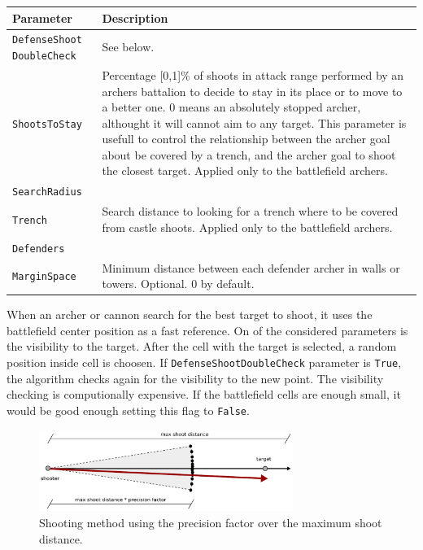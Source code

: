 \documentclass[tog]{acmsiggraph}
\begin{document}
\begin{tabularx}{0.48\textwidth}{ |l|X| }
\hline 
\textbf{Parameter} & \textbf{Description} \\[0.15cm]
 \hline
 \texttt{DefenseShoot DoubleCheck} & See below. \\
 \hline
 \texttt{ShootsToStay} & Percentage [0,1]\% of shoots in attack range performed by an archers battalion to decide to stay in its place or to move to a better one. 0 means an absolutely stopped archer, althought it will cannot aim to any target. This parameter is usefull to control the relationship between the archer goal about be covered by a trench, and the archer goal to shoot the closest target. Applied only to the battlefield archers. \\
 \hline
 \texttt{SearchRadius} & \\
 \texttt{Trench} & Search distance to looking for a trench where to be covered from castle shoots. Applied only to the battlefield archers. \\
 \hline
 \texttt{Defenders} & \\
 \texttt{MarginSpace} & Minimum distance between each defender archer in walls or towers. Optional. 0 by default.\\
 \hline 
\end{tabularx} 

When an archer or cannon search for the best target to shoot, it uses the battlefield center position as a fast reference. 
On of the considered parameters is the visibility to the target.
After the cell with the target is selected, a random position inside cell is choosen.
If \texttt{DefenseShootDoubleCheck} parameter is \texttt{True}, the algorithm checks again for the visibility to the new point.
The visibility checking is computionally expensive. 
If the battlefield cells are enough small, it would be good enough setting this flag to \texttt{False}.

 \begin{figure}[ht]
  \centering
  \includegraphics[width=3.25in]{figs/shooting}
  \caption{Shooting method using the precision factor over the maximum shoot distance.}
  \label{fig:shooting}
\end{figure}
\end{document}
